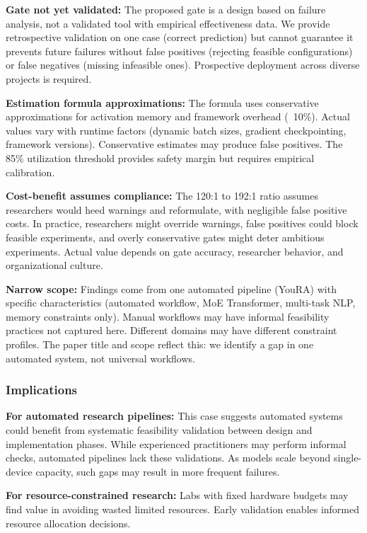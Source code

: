 \textbf{Gate not yet validated:} The proposed gate is a design based on failure analysis, not a validated tool with empirical effectiveness data. We provide retrospective validation on one case (correct prediction) but cannot guarantee it prevents future failures without false positives (rejecting feasible configurations) or false negatives (missing infeasible ones). Prospective deployment across diverse projects is required.

\textbf{Estimation formula approximations:} The formula uses conservative approximations for activation memory and framework overhead (~10\%). Actual values vary with runtime factors (dynamic batch sizes, gradient checkpointing, framework versions). Conservative estimates may produce false positives. The 85\% utilization threshold provides safety margin but requires empirical calibration.

\textbf{Cost-benefit assumes compliance:} The 120:1 to 192:1 ratio assumes researchers would heed warnings and reformulate, with negligible false positive costs. In practice, researchers might override warnings, false positives could block feasible experiments, and overly conservative gates might deter ambitious experiments. Actual value depends on gate accuracy, researcher behavior, and organizational culture.

\textbf{Narrow scope:} Findings come from one automated pipeline (YouRA) with specific characteristics (automated workflow, MoE Transformer, multi-task NLP, memory constraints only). Manual workflows may have informal feasibility practices not captured here. Different domains may have different constraint profiles. The paper title and scope reflect this: we identify a gap in one automated system, not universal workflows.

\subsubsection{Implications}

\textbf{For automated research pipelines:} This case suggests automated systems could benefit from systematic feasibility validation between design and implementation phases. While experienced practitioners may perform informal checks, automated pipelines lack these validations. As models scale beyond single-device capacity, such gaps may result in more frequent failures.

\textbf{For resource-constrained research:} Labs with fixed hardware budgets may find value in avoiding wasted limited resources. Early validation enables informed resource allocation decisions.

